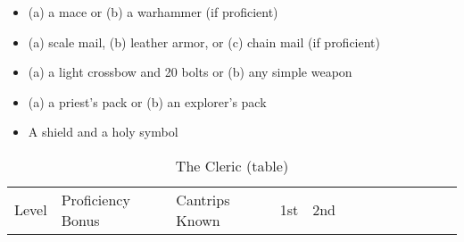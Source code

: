 \begin{itemize}
\item
  (a) a mace or (b) a warhammer (if proficient)
\item
  (a) scale mail, (b) leather armor, or (c) chain mail (if proficient)
\item
  (a) a light crossbow and 20 bolts or (b) any simple weapon
\item
  (a) a priest's pack or (b) an explorer's pack
\item
  A shield and a holy symbol
\end{itemize}

\begin{longtable}[]{@{}
  >{\raggedright\arraybackslash}p{}
  >{\raggedright\arraybackslash}p{}
  >{\raggedright\arraybackslash}p{}
  >{\raggedright\arraybackslash}p{}
  >{\raggedright\arraybackslash}p{}
  >{\raggedright\arraybackslash}p{}
  >{\raggedright\arraybackslash}p{}
  >{\raggedright\arraybackslash}p{}
  >{\raggedright\arraybackslash}p{}
  >{\raggedright\arraybackslash}p{}
  >{\raggedright\arraybackslash}p{}
  >{\raggedright\arraybackslash}p{}
  >{\raggedright\arraybackslash}p{}@{}}
\caption{The Cleric (table)}\label{cleric-table}\tabularnewline
\toprule\noalign{}
\begin{minipage}[b]{\linewidth}\raggedright
Level
\end{minipage} & \begin{minipage}[b]{\linewidth}\raggedright
Proficiency Bonus
\end{minipage} & \begin{minipage}[b]{\linewidth}\centering
Cantrips Known
\end{minipage} & \begin{minipage}[b]{\linewidth}\centering
1st
\end{minipage} & \begin{minipage}[b]{\linewidth}\centering
2nd
\end{minipage} & \begin{minipage}[b]{\linewidth}\centering

\end{minipage}
\end{longtable}
